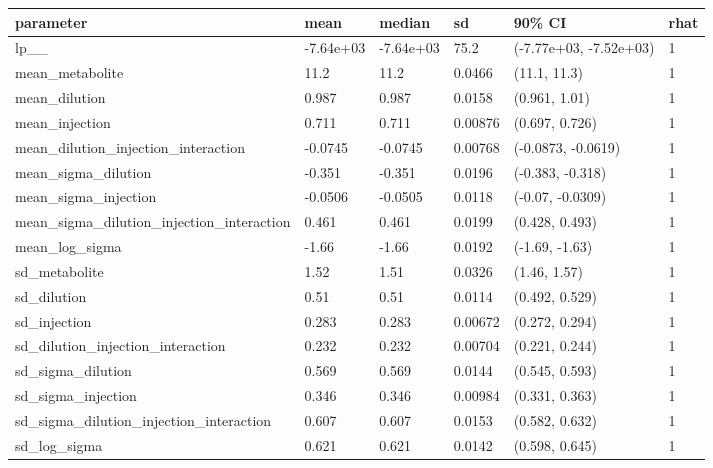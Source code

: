 
\begin{tabular}{l|l|l|l|l|l}
\hline
parameter & mean & median & sd & 90\% CI & rhat\\
\hline
lp\_\_ & -7.64e+03 & -7.64e+03 & 75.2 & (-7.77e+03, -7.52e+03) & 1\\
\hline
mean\_metabolite & 11.2 & 11.2 & 0.0466 & (11.1, 11.3) & 1\\
\hline
mean\_dilution & 0.987 & 0.987 & 0.0158 & (0.961, 1.01) & 1\\
\hline
mean\_injection & 0.711 & 0.711 & 0.00876 & (0.697, 0.726) & 1\\
\hline
mean\_dilution\_injection\_interaction & -0.0745 & -0.0745 & 0.00768 & (-0.0873, -0.0619) & 1\\
\hline
mean\_sigma\_dilution & -0.351 & -0.351 & 0.0196 & (-0.383, -0.318) & 1\\
\hline
mean\_sigma\_injection & -0.0506 & -0.0505 & 0.0118 & (-0.07, -0.0309) & 1\\
\hline
mean\_sigma\_dilution\_injection\_interaction & 0.461 & 0.461 & 0.0199 & (0.428, 0.493) & 1\\
\hline
mean\_log\_sigma & -1.66 & -1.66 & 0.0192 & (-1.69, -1.63) & 1\\
\hline
sd\_metabolite & 1.52 & 1.51 & 0.0326 & (1.46, 1.57) & 1\\
\hline
sd\_dilution & 0.51 & 0.51 & 0.0114 & (0.492, 0.529) & 1\\
\hline
sd\_injection & 0.283 & 0.283 & 0.00672 & (0.272, 0.294) & 1\\
\hline
sd\_dilution\_injection\_interaction & 0.232 & 0.232 & 0.00704 & (0.221, 0.244) & 1\\
\hline
sd\_sigma\_dilution & 0.569 & 0.569 & 0.0144 & (0.545, 0.593) & 1\\
\hline
sd\_sigma\_injection & 0.346 & 0.346 & 0.00984 & (0.331, 0.363) & 1\\
\hline
sd\_sigma\_dilution\_injection\_interaction & 0.607 & 0.607 & 0.0153 & (0.582, 0.632) & 1\\
\hline
sd\_log\_sigma & 0.621 & 0.621 & 0.0142 & (0.598, 0.645) & 1\\
\hline
\end{tabular}
